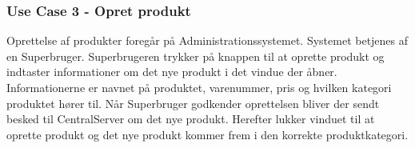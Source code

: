 \subsubsection{Use Case 3 - Opret produkt}
Oprettelse af produkter foregår på Administrationssystemet. Systemet betjenes af en Superbruger. Superbrugeren trykker på knappen til at oprette produkt og indtaster informationer om det nye produkt i det vindue der åbner. Informationerne er navnet på produktet, varenummer, pris og hvilken kategori produktet hører til. Når Superbruger godkender oprettelsen bliver der sendt besked til CentralServer om det nye produkt. Herefter lukker vinduet til at oprette produkt og det nye produkt kommer frem i den korrekte produktkategori.